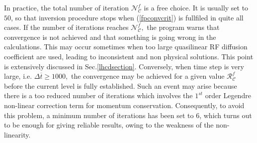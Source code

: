 In practice, the total number of iteration $\mathcal{N}_{\mathcal{C}}^{f}$
is a free choice. It is usually set to $50$, so that inversion procedure
stops when (\ref{fpconvcrit}) is fullfiled in quite all cases. If the number
of iterations reaches $\mathcal{N}_{\mathcal{C}}^{f},$ the program warns
that convergence is not achieved and that something is going wrong in the
calculations. This may occur sometimes when too large quasilinear RF
diffusion coefficient are used, leading to inconsistent and non physical
solutions. This point is extensively discussed in Sec.\ref{lhcdsection}.
Conversely, when time step is very large, i.e. $\Delta \overline{t}\geq 1000,
$ the convergence may be achieved for a given value $\mathcal{R}_{\mathcal{C}%
}^{f}$  before the current level is fully established. Such an event may
arise because there is a too reduced number of iterations which involves the
$1^{st}$ order Legendre non-linear correction term for momentum
conservation. Consequently, to avoid this problem, a minimum number of
iterations has been set to $6$, which turns out to be enough for giving
reliable results, owing to the weakness of the non-linearity.
